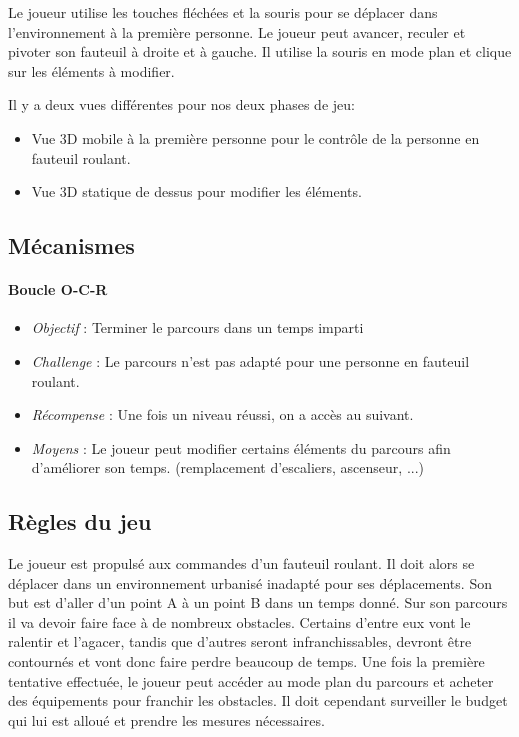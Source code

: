 \documentclass[a4paper,11pt]{article}
\begin{document}
Le joueur utilise les touches fléchées et la souris pour se déplacer dans l’environnement à la première personne. Le joueur peut avancer, reculer et pivoter son fauteuil à droite et à gauche.
Il utilise la souris en mode plan et clique sur les éléments à modifier.

Il y a deux vues différentes pour nos deux phases de jeu: 
\begin{itemize}
\item Vue 3D mobile à la première personne pour le contrôle de la personne en fauteuil roulant.
\item Vue 3D statique de dessus pour modifier les éléments.
\end{itemize}

\subsection*{Mécanismes}
\paragraph{Boucle O-C-R}
\begin{itemize}
\item \textit{Objectif} : Terminer le parcours dans un temps imparti
\item \textit{Challenge} : Le parcours n’est pas adapté pour une personne en fauteuil roulant.
\item \textit{Récompense} : Une fois un niveau réussi, on a accès au suivant.
\item \textit{Moyens} : Le joueur peut modifier certains éléments du parcours afin d’améliorer son temps. (remplacement d’escaliers, ascenseur, ...)
\end{itemize}

\subsection*{Règles du jeu}

Le joueur est propulsé aux commandes d’un fauteuil roulant. Il doit alors se déplacer dans un environnement urbanisé inadapté pour ses déplacements. Son but est d’aller d’un point A à un point B dans un temps donné. Sur son parcours il va devoir faire face à de nombreux obstacles. Certains d’entre eux vont le ralentir et l’agacer, tandis que d’autres seront infranchissables, devront être contournés et vont donc faire perdre beaucoup de temps. Une fois la première tentative effectuée, le joueur peut accéder au mode plan du parcours et acheter des équipements pour franchir les obstacles. Il doit cependant surveiller le budget qui lui est alloué et prendre les mesures nécessaires.
\end{document}
